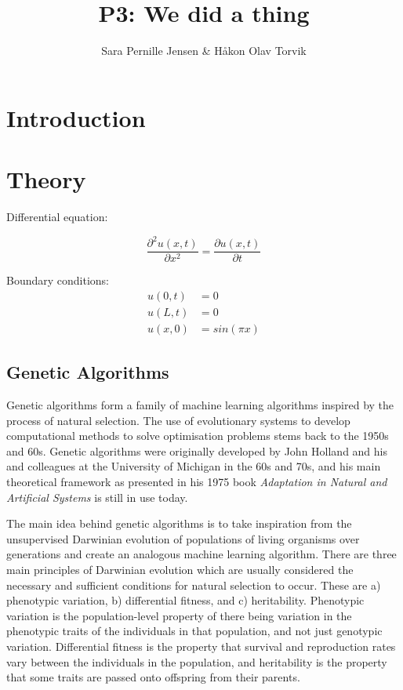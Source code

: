\documentclass[multicolumn, 12pt]{extarticle}
\author{\Large Sara Pernille Jensen \& Håkon Olav Torvik}
\title{\Huge P3: We did a thing}
\affiliation{\large FYS-STK4155 – Applied Data Analysis and Machine Learning
\\Autumn 2021\\Department of Physics\\University of Oslo\\\\\today}
\begin{document}


\maketitle

\pagestyle{myplain}


\twocolumn
\section{Introduction}


\section{Theory}
 
Differential equation:
 
\begin{equation}
\label{eq:diff}
    \frac{\partial^2 u(x, t) }{\partial x^2} = \frac{\partial u(x, t)}{\partial t}
\end{equation}

Boundary conditions: 
\begin{align}
\label{eq:boundary}
    u(0, t) &= 0  \\
    u(L, t) &= 0  \\
    u(x, 0) &= sin(\pi x) 
\end{align}



\subsection{Genetic Algorithms}
Genetic algorithms form a family of machine learning algorithms inspired by the process of natural selection. The use of evolutionary systems to develop computational methods to solve optimisation problems stems back to the 1950s and 60s. Genetic algorithms were originally developed by John Holland and his and colleagues at the University of Michigan in the 60s and 70s, and his main theoretical framework as presented in his 1975 book \textit{Adaptation in Natural and Artificial Systems} \cite{Holland XXX} is still in use today. 

The main idea behind genetic algorithms is to take inspiration from the unsupervised Darwinian evolution of populations of living organisms over generations and create an analogous machine learning algorithm. There are three main principles of Darwinian evolution which are usually considered the necessary and sufficient conditions for natural selection to occur. These are a) phenotypic variation, b) differential fitness, and c) heritability. Phenotypic variation is the population-level property of there being variation in the phenotypic traits of the individuals in that population, and not just genotypic variation. Differential fitness is the property that survival and reproduction rates vary between the individuals in the population, and heritability is the property that some traits are passed onto offspring from their parents. 
\end{document}
